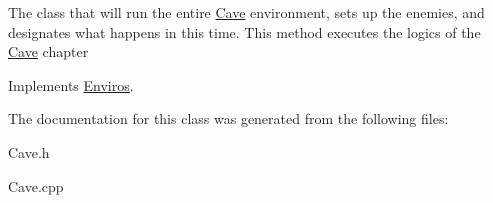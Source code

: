 The class that will run the entire \hyperlink{classCave}{Cave} environment, sets up the enemies, and designates what happens in this time. This method executes the logics of the \hyperlink{classCave}{Cave} chapter 

Implements \hyperlink{classEnviros}{Enviros}.

The documentation for this class was generated from the following files:\begin{DoxyCompactItemize}
\item 
Cave.h\item 
Cave.cpp\end{DoxyCompactItemize}
